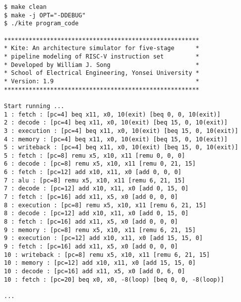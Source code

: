 \documentclass[10pt]{article}
\begin{document}
\begin{Verbatim}[frame=single]
$ make clean
$ make -j OPT="-DDEBUG" 
$ ./kite program_code

*******************************************************
* Kite: An architecture simulator for five-stage      *
* pipeline modeling of RISC-V instruction set         *
* Developed by William J. Song                        *
* School of Electrical Engineering, Yonsei University *
* Version: 1.9                                        *
*******************************************************

Start running ...
1 : fetch : [pc=4] beq x11, x0, 10(exit) [beq 0, 0, 10(exit)]
2 : decode : [pc=4] beq x11, x0, 10(exit) [beq 15, 0, 10(exit)]
3 : execution : [pc=4] beq x11, x0, 10(exit) [beq 15, 0, 10(exit)]
4 : memory : [pc=4] beq x11, x0, 10(exit) [beq 15, 0, 10(exit)]
5 : writeback : [pc=4] beq x11, x0, 10(exit) [beq 15, 0, 10(exit)]
5 : fetch : [pc=8] remu x5, x10, x11 [remu 0, 0, 0]
6 : decode : [pc=8] remu x5, x10, x11 [remu 0, 21, 15]
6 : fetch : [pc=12] add x10, x11, x0 [add 0, 0, 0]
7 : alu : [pc=8] remu x5, x10, x11 [remu 6, 21, 15]
7 : decode : [pc=12] add x10, x11, x0 [add 0, 15, 0]
7 : fetch : [pc=16] add x11, x5, x0 [add 0, 0, 0]
8 : execution : [pc=8] remu x5, x10, x11 [remu 6, 21, 15]
8 : decode : [pc=12] add x10, x11, x0 [add 0, 15, 0]
8 : fetch : [pc=16] add x11, x5, x0 [add 0, 0, 0]
9 : memory : [pc=8] remu x5, x10, x11 [remu 6, 21, 15]
9 : execution : [pc=12] add x10, x11, x0 [add 15, 15, 0]
9 : fetch : [pc=16] add x11, x5, x0 [add 0, 0, 0]
10 : writeback : [pc=8] remu x5, x10, x11 [remu 6, 21, 15]
10 : memory : [pc=12] add x10, x11, x0 [add 15, 15, 0]
10 : decode : [pc=16] add x11, x5, x0 [add 0, 6, 0]
10 : fetch : [pc=20] beq x0, x0, -8(loop) [beq 0, 0, -8(loop)]

...
\end{Verbatim}
\end{document}
